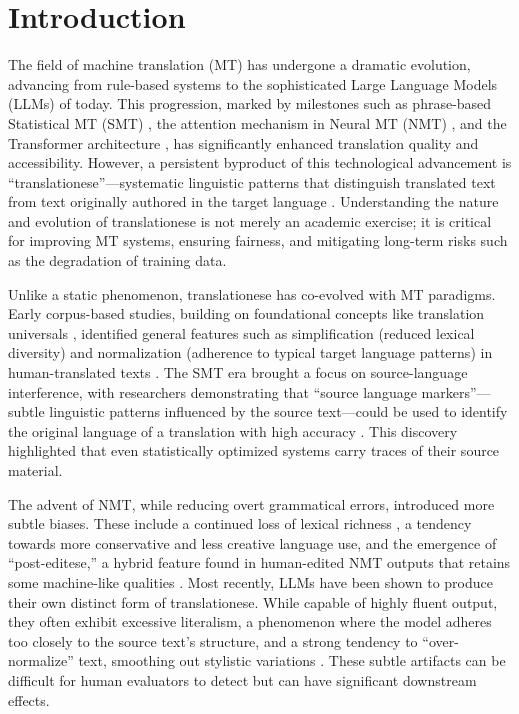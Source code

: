 \section{Introduction}

The field of machine translation (MT) has undergone a dramatic evolution, advancing from rule-based systems to the sophisticated Large Language Models (LLMs) of today. This progression, marked by milestones such as phrase-based Statistical MT (SMT) \cite{koehn2003statistical}, the attention mechanism in Neural MT (NMT) \cite{bahdanau2015neural}, and the Transformer architecture \cite{vaswani2017attention}, has significantly enhanced translation quality and accessibility. However, a persistent byproduct of this technological advancement is ``translationese''---systematic linguistic patterns that distinguish translated text from text originally authored in the target language \cite{gellerstam1986translationese}. Understanding the nature and evolution of translationese is not merely an academic exercise; it is critical for improving MT systems, ensuring fairness, and mitigating long-term risks such as the degradation of training data.

Unlike a static phenomenon, translationese has co-evolved with MT paradigms. Early corpus-based studies, building on foundational concepts like translation universals \cite{baker1993corpus}, identified general features such as simplification (reduced lexical diversity) and normalization (adherence to typical target language patterns) in human-translated texts \cite{laviosa1998corpus}. The SMT era brought a focus on source-language interference, with researchers demonstrating that ``source language markers''---subtle linguistic patterns influenced by the source text---could be used to identify the original language of a translation with high accuracy \cite{van2008source,koppel2011translationese}. This discovery highlighted that even statistically optimized systems carry traces of their source material.

The advent of NMT, while reducing overt grammatical errors, introduced more subtle biases. These include a continued loss of lexical richness \cite{vanmassenhove2019getting}, a tendency towards more conservative and less creative language use, and the emergence of ``post-editese,'' a hybrid feature found in human-edited NMT outputs that retains some machine-like qualities \cite{toral2019post}. Most recently, LLMs have been shown to produce their own distinct form of translationese. While capable of highly fluent output, they often exhibit excessive literalism, a phenomenon where the model adheres too closely to the source text's structure, and a strong tendency to ``over-normalize'' text, smoothing out stylistic variations \cite{li2025how,wang2024benchmarking}. These subtle artifacts can be difficult for human evaluators to detect but can have significant downstream effects.

